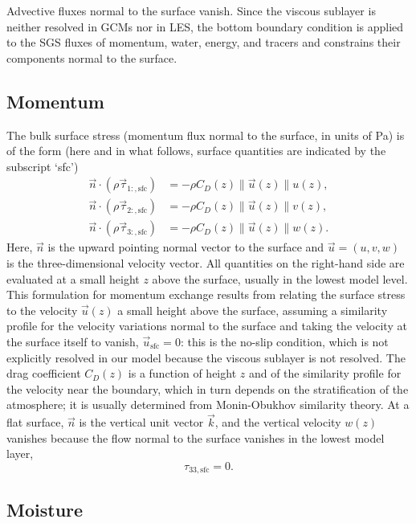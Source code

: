 \documentclass{report}
\begin{document}
Advective fluxes normal to the surface vanish. Since the viscous sublayer is neither resolved in GCMs nor in LES, the bottom boundary condition is applied to the SGS fluxes of momentum, water, energy, and tracers and constrains their components normal to the surface. 

\subsection{Momentum}

The bulk surface stress (momentum flux normal to the surface, in units of Pa) is of the form (here and in what follows, surface quantities are indicated by the subscript `sfc')
\begin{subequations}
\begin{align}
\vec{n} \cdot (\rho\vec{\tau}_{1:, \mathrm{sfc}}) & = -\rho C_D(z) \|\vec{u}(z)\| u(z), \\
\vec{n} \cdot (\rho\vec{\tau}_{2:, \mathrm{sfc}}) & = -\rho C_D(z) \|\vec{u}(z)\| v(z),\\
\vec{n} \cdot (\rho\vec{\tau}_{3:, \mathrm{sfc}}) & = -\rho C_D(z) \|\vec{u}(z)\| w(z).
\end{align}
\end{subequations}
Here, $\vec{n}$ is the upward pointing normal vector to the surface and $\vec{u} = (u, v, w)$ is the three-dimensional velocity vector. All quantities on the right-hand side are evaluated at a small height $z$ above the surface, usually in the lowest model level. This formulation for momentum exchange results from relating the surface stress to the velocity $\vec{u}(z)$ a small height above the surface, assuming a similarity profile for the velocity variations normal to the surface and taking the velocity at the surface itself to vanish, $\vec{u}_\mathrm{sfc} =0$: this is the no-slip condition, which is not explicitly resolved in our model because the viscous sublayer is not resolved. The drag coefficient  $C_D(z)$ is a function of height $z$ and of the similarity profile for the velocity near the boundary, which in turn depends on the stratification of the atmosphere; it is usually determined from Monin-Obukhov similarity theory. At a flat surface, $\vec{n}$ is the vertical unit vector $\vec{k}$, and the vertical velocity $w(z)$ vanishes because the flow normal to the surface vanishes in the lowest model layer,
\[
\tau_{33, \mathrm{sfc}} = 0.
\]

\subsection{Moisture} 
\end{document}
